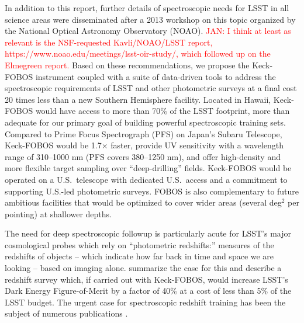 \documentclass[oneside,11pt]{amsart}
\begin{document}


In addition to this report, further details of spectroscopic needs for LSST in all science areas were disseminated
after a 2013 workshop on this topic organized by the National Optical Astronomy Observatory (NOAO).
\textcolor{red}{JAN: I think at least as relevant is the NSF-requested Kavli/NOAO/LSST report,
https://www.noao.edu/meetings/lsst-oir-study/, which followed up on the Elmegreen report.} Based on these
recommendations, we propose the Keck-FOBOS instrument coupled with a suite of data-driven tools to address the
spectroscopic requirements of LSST and other photometric surveys at a final cost 20 times less than a new Southern
Hemisphere facility. Located in Hawaii, Keck-FOBOS would have access to more than 70\% of the LSST footprint, more than
adequate for our primary goal of building powerful spectroscopic training sets.  Compared to Prime Focus Spectrograph
(PFS) on Japan's Subaru Telescope, Keck-FOBOS would be 1.7$\times$ faster, provide UV sensitivity with a wavelength
range of 310--1000 nm (PFS covers 380--1250 nm), and offer high-density and more flexible target sampling over
``deep-drilling'' fields.  Keck-FOBOS would be operated on a U.S.\ telescope with dedicated U.S.\ access and a
commitment to supporting U.S.-led photometric surveys.  FOBOS is also complementary to future ambitious facilities that
would be optimized to cover wider areas (several deg$^2$ per pointing) at shallower depths.

The need for deep spectroscopic followup is particularly acute for LSST's major cosmological probes which rely on
``photometric redshifts:'' measures of the redshifts of objects -- which indicate how far back in time and space we are
looking -- based on imaging alone.  \citet{newman15} summarize the case for this and describe a redshift survey which,
if carried out with Keck-FOBOS, would increase LSST's Dark Energy Figure-of-Merit by a factor of 40\% at a cost of less
than 5\% of the LSST budget.  The urgent case for spectroscopic redshift training has been the subject of numerous
publications \citep[e.g.,][]{laureijs11,masters15, hemmati18}.
\end{document}
